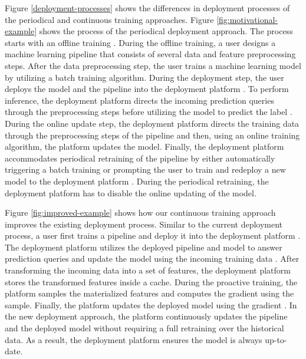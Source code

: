 Figure \ref{deployment-processes} shows the differences in deployment processes of the periodical and continuous training approaches.
Figure \ref{fig:motivational-example} shows the process of the periodical deployment approach.
The process starts with an offline training .
During the offline training, a user designs a machine learning pipeline that consists of several data and feature preprocessing steps. 
After the data preprocessing step, the user trains a machine learning model by utilizing a batch training algorithm.
During the deployment step, the user deploys the model and the pipeline into the deployment platform .
To perform inference, the deployment platform directs the incoming prediction queries through the preprocessing steps before utilizing the model to predict the label .
During the online update step, the deployment platform directs the training data through the preprocessing steps of the pipeline and then, using an online training algorithm, the platform updates the model.
Finally, the deployment platform accommodates periodical retraining of the pipeline by either automatically triggering a batch training or prompting the user to train and redeploy a new model to the deployment platform .
During the periodical retraining, the deployment platform has to disable the online updating of the model.

Figure \ref{fig:improved-example} shows how our continuous training approach improves the existing deployment process.
Similar to the current deployment process, a user first trains a pipeline  and deploy it into the deployment platform .
The deployment platform utilizes the deployed pipeline and model to answer prediction queries and update the model using the incoming training data .
After transforming the incoming data into a set of features, the deployment platform stores the transformed features inside a cache.
During the proactive training, the platform samples the materialized features and computes the gradient using the sample.
Finally, the platform updates the deployed model using the gradient .
In the new deployment approach, the platform continuously updates the pipeline and the deployed model without requiring a full retraining over the historical data.
As a result, the deployment platform ensures the model is always up-to-date.
